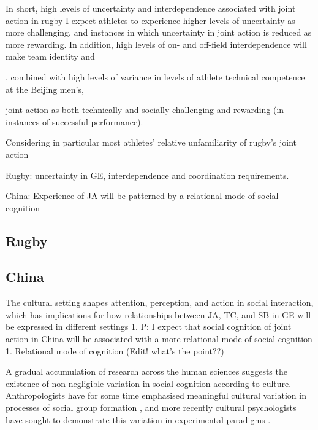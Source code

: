 \begin{CJK}{UTF8}{gbsn}
In short, high levels of uncertainty and interdependence associated with joint action in rugby I expect athletes to experience higher levels of uncertainty as more challenging, and instances in which uncertainty in joint action is reduced as more rewarding.  In addition, high levels of on- and off-field interdependence will make team identity and

, combined with high levels of variance in levels of athlete technical competence at the Beijing men's,

joint action as both technically and socially challenging and rewarding (in instances of successful performance).


Considering in particular most athletes' relative unfamiliarity of rugby's joint action


 Rugby: uncertainty in GE, interdependence and coordination requirements.

China: Experience of JA will be patterned by a relational mode of social cognition





\subsection{Rugby}

















\subsection{China}
The cultural setting shapes attention, perception, and action in social interaction, which has implications for how relationships between JA, TC, and SB in GE will be expressed in different settings
        1. P: I expect that social cognition of joint action in China will be associated with a more relational mode of social cognition
            1. Relational mode of cognition (Edit! what's the point??)

A gradual accumulation of research across the human sciences suggests the existence of non-negligible variation in social cognition according to culture.  Anthropologists have for some time emphasised meaningful cultural variation in processes of social group formation \citep{Strodtbeck1961,Kluckhohn1961,Mead1967,Fei1992}, and more recently cultural psychologists have sought to demonstrate this variation in experimental paradigms \citep{Markus1991,Nisbett2001}. %


\end{CJK}
